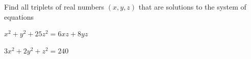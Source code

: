 Find all triplets of real numbers $(x,y,z)$ that are solutions to the system of equations

$x^2+y^2+25z^2=6xz+8yz$

$ 3x^2+2y^2+z^2=240$
